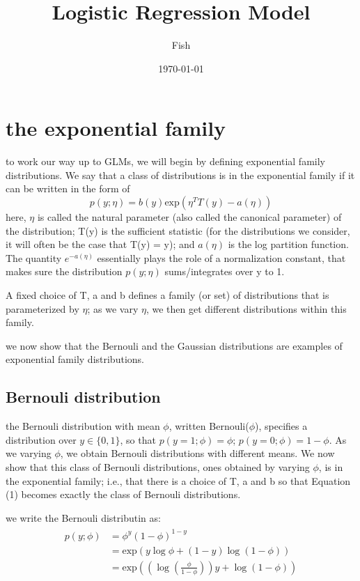 \documentclass[12pt]{ctexart}%
\title{\kaishu Logistic Regression Model}
\author{Fish}
\date{\today}
\begin{document}
	\maketitle
	\renewcommand{\contentsname}{Content} %
	\tableofcontents
	\clearpage
	\pagestyle{fancy}
	
	\section{\quad the exponential family}
	to work our way up to GLMs, we will begin by defining exponential family distributions. We say that a class of distributions is in the exponential family if it can be written in the form of 
	\begin{equation}
	p(y;\eta) = b(y)\text{exp}(\eta^T T(y) - a(\eta) )
	\end{equation}
	\qquad here, $\eta$ is called the natural parameter (also called the canonical parameter) of the distribution; T(y) is the sufficient statistic (for the distributions we consider, it will often be the case that T(y) = y); and $a(\eta)$ is the log partition function. The quantity $e^{-a(\eta)}$ essentially plays the role of a normalization constant, that makes sure the distribution $p(y;\eta)$ sums/integrates over y to 1.
	
	A fixed choice of T, a and b defines a family (or set) of distributions that is parameterized by $\eta$; as we vary $\eta$, we then get different distributions within this family. 
	
	we now show that the Bernouli and the Gaussian distributions are examples of exponential family distributions.
	
	\subsection{\quad Bernouli distribution}
		the Bernouli distribution with mean $\phi$, written Bernouli($\phi$), specifies a distribution over $y\in{\{0,1\}}$, so that $p(y=1;\phi) = \phi$; $p(y=0;\phi) = 1-\phi$. As we varying $\phi$, we obtain Bernouli distributions with different means. We now show that this class of Bernouli distributions, ones obtained by varying $\phi$, is in the exponential family; i.e., that there is a choice of T, a and b so that Equation (1) becomes exactly the class of Bernouli distributions.
		
		we write the Bernouli distributin as:
		\begin{align}
			\begin{split}
				p(y;\phi) &= \phi^y (1-\phi)^{1-y}\\
						  &= \text{exp}(y\log{\phi} + (1-y)\log{(1-\phi)})\\
						  &= \text{exp}((\log{(\frac{\phi}{1-\phi})})y + \log{(1-\phi)})
			\end{split}
		\end{align}
		
\end{document}

